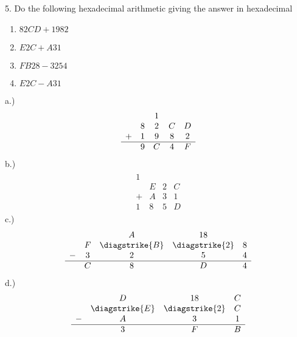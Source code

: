 \documentclass{report}
\begin{document}
    \bigbreak \noindent 
    \begin{mdframed}
        5. Do the following hexadecimal arithmetic giving the answer in hexadecimal
        \begin{enumerate}[label=(\alph*)]
            \item $82CD + 1982$
            \item $E2C + A31$
            \item $FB28 - 3254$
            \item $E2C - A31$
        \end{enumerate}
    \end{mdframed}
    \bigbreak \noindent 
    a.)
    \begin{align*}
        \begin{array}{ccccc}
           &&1&& \\
           &8&2&C&D \\
            +&1&9&8&2 \\
            \hline
             &9&C&4&F
        \end{array}
    \end{align*}
    b.)
    \begin{align*}
        \begin{array}{cccc}
            1&&& \\
             &E&2&C \\
            +&A&3&1 \\
            \hline
            1&8&5&D
        \end{array}
    \end{align*}
    \bigbreak \noindent 
    c.)
    \begin{align*}
        \begin{array}{ccccc}
           &&A&18&  \\
           &F&\diagstrike{B}&\diagstrike{2}&8 \\
            -&3&2&5&4 \\
            \hline
             &C&8&D&4
        \end{array}
    \end{align*}
    d.)
    \begin{align*}
        \begin{array}{cccc}
           &D&18&C \\
           &\diagstrike{E}&\diagstrike{2}&C \\
            -&A&3&1 \\
            \hline
             &3&F&B
        \end{array}
    \end{align*}
\end{document}
